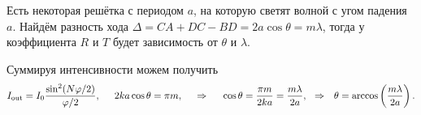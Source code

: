Есть некоторая решётка с периодом $a$, на которую светят волной с угом падения $a$. 
Найдём разность хода $\Delta = CA+DC-BD = 2 a \cos \theta = m \lambda$, тогда у коэффициента $R$ и $T$ будет зависимость от $\theta$ и $\lambda$.

Суммируя интенсивности можем получить
\begin{equation*}
    I_{\text{out}} = I_0 \frac{\sin^2 (N \varphi/2)}{\varphi/2},
    \hspace{5 mm} 
    2 k a \cos \theta = \pi m,
    \hspace{0.5cm} \Rightarrow \hspace{0.5cm}
    \cos \theta =  \frac{\pi m }{2 k a}
    = \frac{m \lambda}{2 a},
    \hspace{0.25cm} \Rightarrow \hspace{0.25cm}
    \theta = \arccos\left(\frac{m \lambda}{2a}\right).
\end{equation*}


